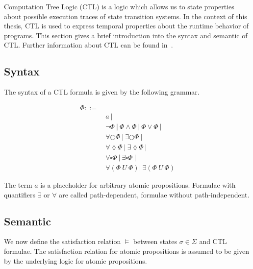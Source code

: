 \documentclass[11pt,a4paper,titlepage]{article}
\theoremstyle{definition}
\begin{document}
Computation Tree Logic (CTL) is a logic which allows us to state properties about possible execution traces of state transition systems. 
In the context of this thesis, CTL is used to express temporal properties about the runtime behavior of programs. 
This section gives a brief introduction into the syntax and semantic of CTL. 
Further information about CTL can be found in~\cite{baier2008principles}.

\subsection{Syntax}
The syntax of a CTL formula is given by the following grammar.

\begin{align*}
    \Phi  ::= \ & \\ 
    & a \ | \\
    & \neg \Phi \ | \ \Phi \land \Phi \ | \ \Phi \lor \Phi \ | \\
    & \forall\bigcirc\Phi \ | \ \exists\bigcirc\Phi \ | \\
    & \forall\lozenge\Phi \ | \ \exists\lozenge\Phi \ | \\
    & \forall\square\Phi \ | \ \exists\square\Phi \ | \\
    & \forall(\Phi \ U \ \Phi) | \ \exists(\Phi \ U \ \Phi) 
\end{align*}

The term $a$ is a placeholder for arbitrary atomic propositions. Formulae with quantifiers $\exists$ or $\forall$ are called
path-dependent, formulae without path-independent.

\subsection{Semantic}

We now define the satisfaction relation $\models$ between states $\sigma \in \Sigma$ and CTL formulae.
The satisfaction relation for atomic propositions is assumed to be given by the underlying 
logic for atomic propositions.
\end{document}
